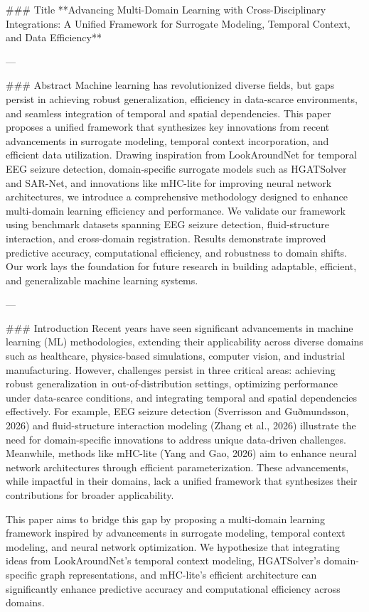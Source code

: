 ### Title  
**Advancing Multi-Domain Learning with Cross-Disciplinary Integrations: A Unified Framework for Surrogate Modeling, Temporal Context, and Data Efficiency**

---

### Abstract  
Machine learning has revolutionized diverse fields, but gaps persist in achieving robust generalization, efficiency in data-scarce environments, and seamless integration of temporal and spatial dependencies. This paper proposes a unified framework that synthesizes key innovations from recent advancements in surrogate modeling, temporal context incorporation, and efficient data utilization. Drawing inspiration from LookAroundNet for temporal EEG seizure detection, domain-specific surrogate models such as HGATSolver and SAR-Net, and innovations like mHC-lite for improving neural network architectures, we introduce a comprehensive methodology designed to enhance multi-domain learning efficiency and performance. We validate our framework using benchmark datasets spanning EEG seizure detection, fluid-structure interaction, and cross-domain registration. Results demonstrate improved predictive accuracy, computational efficiency, and robustness to domain shifts. Our work lays the foundation for future research in building adaptable, efficient, and generalizable machine learning systems.

---

### Introduction  
Recent years have seen significant advancements in machine learning (ML) methodologies, extending their applicability across diverse domains such as healthcare, physics-based simulations, computer vision, and industrial manufacturing. However, challenges persist in three critical areas: achieving robust generalization in out-of-distribution settings, optimizing performance under data-scarce conditions, and integrating temporal and spatial dependencies effectively. For example, EEG seizure detection (Sverrisson and Guðmundsson, 2026) and fluid-structure interaction modeling (Zhang et al., 2026) illustrate the need for domain-specific innovations to address unique data-driven challenges. Meanwhile, methods like mHC-lite (Yang and Gao, 2026) aim to enhance neural network architectures through efficient parameterization. These advancements, while impactful in their domains, lack a unified framework that synthesizes their contributions for broader applicability.  

This paper aims to bridge this gap by proposing a multi-domain learning framework inspired by advancements in surrogate modeling, temporal context modeling, and neural network optimization. We hypothesize that integrating ideas from LookAroundNet's temporal context modeling, HGATSolver's domain-specific graph representations, and mHC-lite's efficient architecture can significantly enhance predictive accuracy and computational efficiency across domains.  

